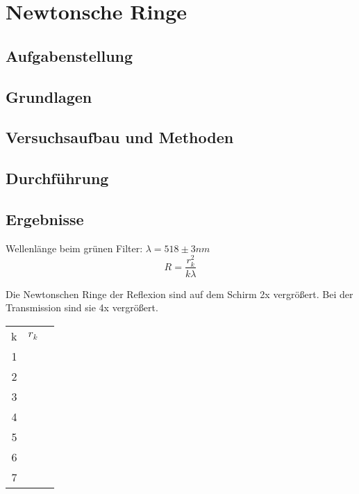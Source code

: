 \documentclass{article}
\begin{document}
\section{Newtonsche Ringe}

\subsection{Aufgabenstellung}
\subsection{Grundlagen}
\subsection{Versuchsaufbau und Methoden}
\subsection{Durchführung}
\subsection{Ergebnisse}
Wellenlänge beim grünen Filter: $\lambda=518 \pm 3nm$
$$R=\frac{r_k^2}{k\lambda}$$

Die Newtonschen Ringe der Reflexion sind auf dem Schirm 2x vergrößert. Bei der Transmission sind sie 4x vergrößert.

\begin{tabular}{r|c|l}
k & $r_k$ & \\
1 & &\\
2 & &\\
3 & &\\
4 & &\\
5 & &\\
6 & &\\
7 & &\\

\end{tabular}
\end{document}

